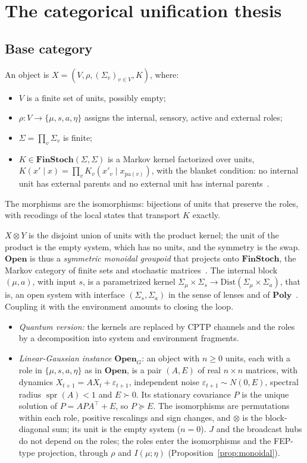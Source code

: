 \section{The categorical unification thesis}\label{sec:categorica}
\subsection{Base category}\label{sec:base}
\begin{definition}
An object is $X=(V,\rho,(\Sigma_v)_{v\in V},K)$, where:
\begin{itemize}
\item $V$ is a finite set of units, possibly empty;
\item $\rho:V\to\{\mu,s,a,\eta\}$ assigns the internal, sensory, active and external roles;
\item $\Sigma=\prod_v\Sigma_v$ is finite;
\item $K\in\mathbf{FinStoch}(\Sigma,\Sigma)$ is a Markov kernel factorized over units, $K(x'\mid x)=\prod_vK_v(x'_v\mid x_{\mathrm{pa}(v)})$, with the blanket condition: no internal unit has external parents and no external unit has internal parents~\cite{Friston2013}.
\end{itemize}
The morphisms are the isomorphisms: bijections of units that preserve the roles, with recodings of the local states that transport $K$ exactly.
\end{definition}
$X\otimes Y$ is the disjoint union of units with the product kernel; the unit of the product is the empty system, which has no units, and the symmetry is the swap. $\mathbf{Open}$ is thus a \emph{symmetric monoidal groupoid} that projects onto $\mathbf{FinStoch}$, the Markov category of finite sets and stochastic matrices~\cite{Fritz2020}. The internal block $(\mu,a)$, with input $s$, is a parametrized kernel $\Sigma_\mu\times\Sigma_s\to\mathrm{Dist}(\Sigma_\mu\times\Sigma_a)$, that is, an open system with interface $(\Sigma_s,\Sigma_a)$ in the sense of lenses and of $\mathbf{Poly}$~\cite{Capucci2022,NiuSpivak2023}. Coupling it with the environment amounts to closing the loop.
\begin{itemize}
\item \emph{Quantum version:} the kernels are replaced by CPTP channels and the roles by a decomposition into system and environment fragments.
\item \emph{Linear-Gaussian instance} $\mathbf{Open}_G$: an object with $n\ge0$ units, each with a role in $\{\mu,s,a,\eta\}$ as in $\mathbf{Open}$, is a pair $(A,E)$ of real $n\times n$ matrices, with dynamics $X_{t+1}=AX_t+\varepsilon_{t+1}$, independent noise $\varepsilon_{t+1}\sim N(0,E)$, spectral radius $\operatorname{spr}(A)<1$ and $E\succ0$. Its stationary covariance $P$ is the unique solution of $P=APA^\top+E$, so $P\succeq E$. The isomorphisms are permutations within each role, positive rescalings and sign changes, and $\otimes$ is the block-diagonal sum; its unit is the empty system ($n=0$). $J$ and the broadcast hubs do not depend on the roles; the roles enter the isomorphisms and the FEP-type projection, through $\rho$ and $I(\mu;\eta)$ (Proposition~\ref{prop:monoidal}).
\end{itemize}

